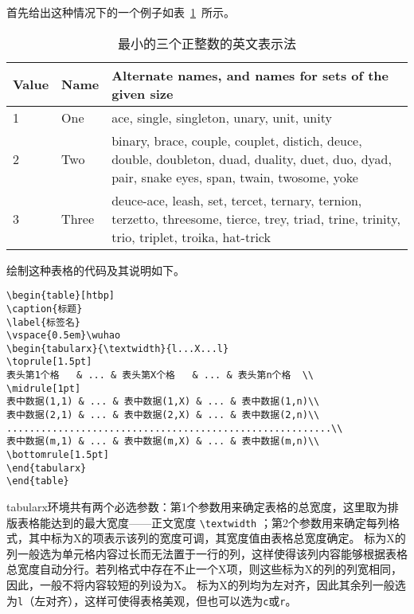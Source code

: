 首先给出这种情况下的一个例子如表~\ref{table3}~所示。
\begin{table}[htbp]
  \centering
  \caption{最小的三个正整数的英文表示法}
  \label{table3}
  \vspace{0.5em}\wuhao
  \begin{tabularx}{0.7\textwidth}{llX}
    \toprule[1.5pt]
    Value & Name  & Alternate names, and names for sets of the given size                                                                                           \\\midrule[1pt]
    1     & One   & ace, single, singleton, unary, unit, unity                                                                                                      \\
    2     & Two   & binary, brace, couple, couplet, distich, deuce, double, doubleton, duad, duality, duet, duo, dyad, pair, snake eyes, span, twain, twosome, yoke \\
    3     & Three & deuce-ace, leash, set, tercet, ternary, ternion, terzetto, threesome, tierce, trey, triad, trine, trinity, trio, triplet, troika, hat-trick     \\\bottomrule[1.5pt]
  \end{tabularx}
\end{table}

绘制这种表格的代码及其说明如下。
\vspace{1em}
\begin{lstlisting}
\begin{table}[htbp]
\caption{标题}
\label{标签名}
\vspace{0.5em}\wuhao
\begin{tabularx}{\textwidth}{l...X...l}
\toprule[1.5pt]
表头第1个格   & ... & 表头第X个格   & ... & 表头第n个格  \\
\midrule[1pt]
表中数据(1,1) & ... & 表中数据(1,X) & ... & 表中数据(1,n)\\
表中数据(2,1) & ... & 表中数据(2,X) & ... & 表中数据(2,n)\\
.........................................................\\
表中数据(m,1) & ... & 表中数据(m,X) & ... & 表中数据(m,n)\\
\bottomrule[1.5pt]
\end{tabularx}
\end{table}
\end{lstlisting}


tabularx环境共有两个必选参数：第1个参数用来确定表格的总宽度，这里取为排版表格能达到的最大宽度——正文宽度 \verb|\textwidth| ；第2个参数用来确定每列格式，其中标为X的项表示该列的宽度可调，其宽度值由表格总宽度确定。
标为X的列一般选为单元格内容过长而无法置于一行的列，这样使得该列内容能够根据表格总宽度自动分行。若列格式中存在不止一个X项，则这些标为X的列的列宽相同，因此，一般不将内容较短的列设为X。
标为X的列均为左对齐，因此其余列一般选为\texttt{l}（左对齐），这样可使得表格美观，但也可以选为\texttt{c}或\texttt{r}。


